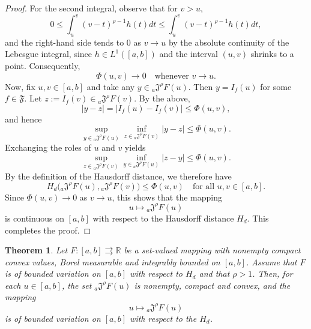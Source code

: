 \documentclass[a4paper,12pt,reqno]{amsart}
\numberwithin{equation}{section}
\newtheorem{theorem}{Theorem}[section]
\theoremstyle{definition}
\theoremstyle{remark}
\numberwithin{equation}{section}
\begin{document}
\begin{proof}
For the second integral, observe that for $v>u$,
\[ 0\le\int_{u}^{v}(v-t)^{\rho-1}h(t)dt \le\int_{u}^{v}(v-t)^{\rho-1}h(t)dt, \] and the right-hand side tends to $0$ as $v\to u$ by the absolute continuity of the Lebesgue integral, since $h\in L^{1}([a,b])$ and the interval $(u,v)$ shrinks to a point. Consequently,
\[ \Phi(u,v)\to 0 \quad\text{whenever }v\to u. \]
Now, fix $u,v\in[a,b]$ and take any $y\in {}_{a}\mathfrak{J}^{\rho}F(u)$. Then
$y=I_f(u)$ for some $f\in\mathfrak{F}$. Let $z:=I_f(v)\in
{}_{a}\mathfrak{J}^{\rho}F(v)$. By the above,
\[ |y-z|=\big|I_f(u)-I_f(v)\big|\le\Phi(u,v), \]
and hence
\[\sup_{y\in {}_{a}\mathfrak{J}^{\rho}F(u)} \inf_{z\in {}_{a}\mathfrak{J}^{\rho}F(v)}|y-z| \le\Phi(u,v). \]
Exchanging the roles of $u$ and $v$ yields
\[ \sup_{z\in {}_{a}\mathfrak{J}^{\rho}F(v)} \inf_{y\in {}_{a}\mathfrak{J}^{\rho}F(u)}|z-y| \le\Phi(u,v). \]
By the definition of the Hausdorff distance, we therefore have
\[ H_d\big({}_{a}\mathfrak{J}^{\rho}F(u),{}_{a}\mathfrak{J}^{\rho}F(v)\big) \le\Phi(u,v)
\quad\text{for all }u,v\in[a,b]. \]
Since $\Phi(u,v)\to 0$ as $v\to u$, this shows that the mapping
\[u\longmapsto {}_{a}\mathfrak{J}^{\rho}F(u) \]
is continuous on $[a,b]$ with respect to the Hausdorff distance $H_d$. This completes the proof. 
\end{proof}
\begin{theorem}\label{BV}
Let $F:[a,b]\rightrightarrows\mathbb{R}$ be a set-valued mapping with nonempty compact convex values, Borel measurable and integrably bounded on $[a,b]$.
Assume that $F$ is of bounded variation on $[a,b]$ with respect to $H_d$ and that $\rho>1$. Then, for each $u\in[a,b]$, the set ${}_{a}\mathfrak{J}^{\rho}F(u)$ is nonempty, compact and convex, and the mapping
$$ u \longmapsto {}_{a}\mathfrak{J}^{\rho}F(u) $$ is of bounded variation on $[a,b]$ with respect to the $H_d$.
\end{theorem}
\end{document}
